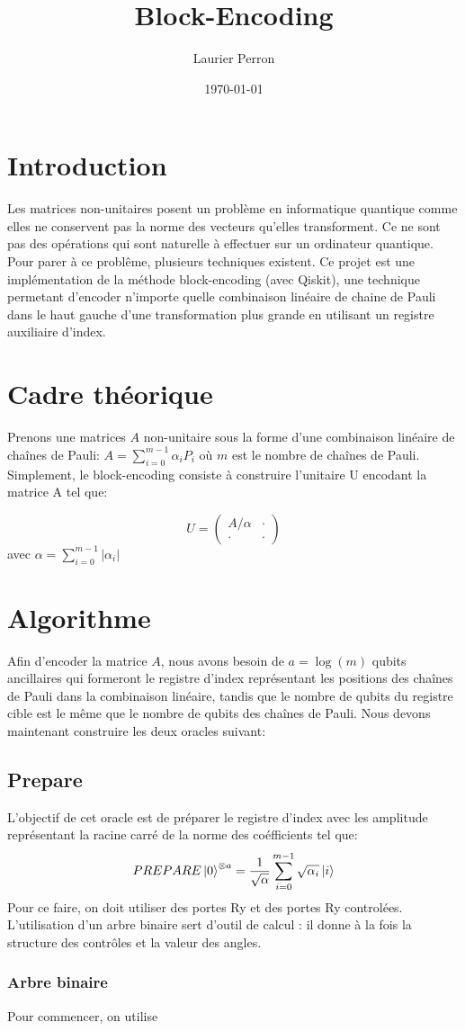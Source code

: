 \documentclass{article}
\title{Block-Encoding}
\author{Laurier Perron}
\date{\today}
\begin{document}
\maketitle

\section{Introduction}
Les matrices non-unitaires posent un problème en informatique quantique comme elles ne conservent pas la norme des vecteurs qu'elles transforment. Ce ne sont pas des opérations qui sont naturelle à effectuer sur un ordinateur quantique. Pour parer à ce problême, plusieurs techniques existent. Ce projet est une implémentation de la méthode block-encoding (avec Qiskit), une technique permetant d'encoder n'importe quelle combinaison linéaire de chaine de Pauli dans le haut gauche d'une transformation plus grande en utilisant un registre auxiliaire d'index.

\section{Cadre théorique}
Prenons une matrices $A$ non-unitaire sous la forme d'une combinaison linéaire de chaînes de Pauli: $A = \sum_{i=0}^{m-1} \alpha_i P_i$ où $m$ est le nombre de chaînes de Pauli. Simplement, le block-encoding consiste à construire l'unitaire U encodant la matrice A tel que:

$$
    U = \begin{pmatrix} A/\alpha & \cdot \\ \cdot & \cdot \end{pmatrix}
$$
avec $\alpha = \sum_{i=0}^{m-1} |\alpha_i|$


\section{Algorithme}
Afin d'encoder la matrice $A$, nous avons besoin de $a = \log(m) $ qubits ancillaires qui formeront le registre d'index représentant les positions des chaînes de Pauli dans la combinaison linéaire, tandis que le nombre de qubits du registre cible est le même que le nombre de qubits des chaînes de Pauli. Nous devons maintenant construire les deux oracles suivant:

\subsection{Prepare}
L'objectif de cet oracle est de préparer le registre d'index avec les amplitude représentant la racine carré de la norme des coéfficients tel que:
$$ PREPARE\ket{0}^{\otimes{a}} = \frac{1}{\sqrt{\alpha}} \sum_{i=0}^{m-1} \sqrt{\alpha_i}\ket{i}$$
Pour ce faire, on doit utiliser des portes Ry et des portes Ry controlées. L'utilisation d'un arbre binaire sert d'outil de calcul : il donne à la fois la structure des contrôles et la valeur des angles.
\subsubsection{Arbre binaire}
Pour commencer, on utilise 
\end{document}
